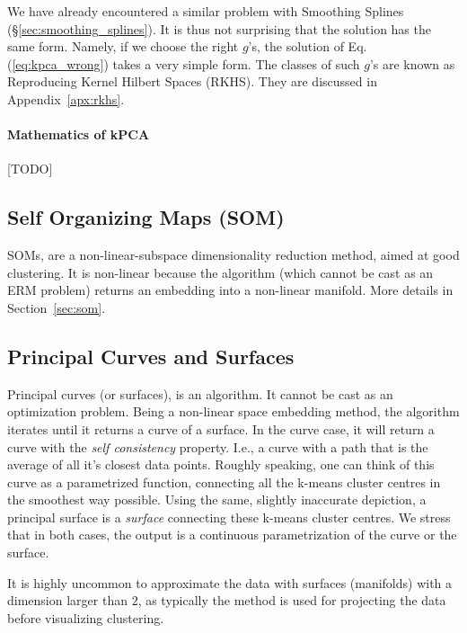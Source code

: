We have already encountered a similar problem with Smoothing Splines (\S\ref{sec:smoothing_splines}). It is thus not surprising that the solution has the same form. 
Namely, if we choose the right $g$'s, the solution of Eq.(\ref{eq:kpca_wrong}) takes a very simple form. 
The classes of such $g$'s are known as Reproducing Kernel Hilbert Spaces (RKHS). 
They are discussed in Appendix~\ref{apx:rkhs}.



\paragraph{Mathematics of kPCA}
[TODO]




\subsection{Self Organizing Maps (SOM)}
SOMs, are a non-linear-subspace dimensionality reduction method, aimed at good clustering. 
It is non-linear because the algorithm (which cannot be cast as an ERM problem) returns an embedding into a non-linear manifold.
More details in Section~\ref{sec:som}.



\subsection{Principal Curves and Surfaces}

Principal curves (or surfaces), is an algorithm. It cannot be cast as an optimization problem.
Being a non-linear space embedding method, the algorithm iterates until it returns a curve of a surface.
In the curve case, it will return a curve with the \emph{self consistency} property. I.e., a curve with a path that is the average of all it's closest data points.
Roughly speaking, one can think of this curve as a parametrized function, connecting all the k-means cluster centres in the smoothest way possible.
Using the same, slightly inaccurate depiction, a principal surface is a \emph{surface} connecting these k-means cluster centres.
We stress that in both cases, the output is a continuous parametrization of the curve or the surface.

It is highly uncommon to approximate the data with surfaces (manifolds) with a dimension larger than $2$, as typically the method is used for projecting the data before visualizing \andor clustering.






